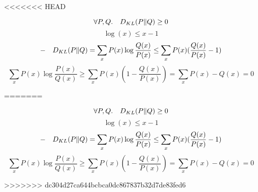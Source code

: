 <<<<<<< HEAD
\begin{answer}
$$\forall P, Q. \quad D_{KL}(P\|Q) \geq 0$$
$$\log(x) \leq x - 1$$
$$-\quad D_{KL}(P\|Q) = \sum_x P(x) \log\frac{Q(x)}{P(x)} \leq \sum_x P(x)(\frac{Q(x)}{P(x)} - 1)$$
$$\sum_x P(x) \log\frac{P(x)}{Q(x)} \geq \sum_x P(x)(1-\frac{Q(x)}{P(x)}) = \sum_x P(x) - Q(x) = 0$$
\end{answer}
=======
\begin{answer}
$$\forall P, Q. \quad D_{KL}(P\|Q) \geq 0$$
$$\log(x) \leq x - 1$$
$$-\quad D_{KL}(P\|Q) = \sum_x P(x) \log\frac{Q(x)}{P(x)} \leq \sum_x P(x)(\frac{Q(x)}{P(x)} - 1)$$
$$\sum_x P(x) \log\frac{P(x)}{Q(x)} \geq \sum_x P(x)(1-\frac{Q(x)}{P(x)}) = \sum_x P(x) - Q(x) = 0$$
\end{answer}
>>>>>>> dc304d27ca644bcbca0dc867837b32d7de83fed6
